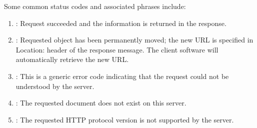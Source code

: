 Some common status codes and associated phrases include:
\begin{enumerate}
    \item {}: Request succeeded and the information is returned in the response.
    \item {}: Requested object has been permanently moved;
    the new URL is specified in Location: header of the response message. The
    client software will automatically retrieve the new URL.
    \item {}: This is a generic error code indicating that the request
could not be understood by the server.
    \item {}: The requested document does not exist on this server.
    \item {}: The requested HTTP protocol
    version is not supported by the server.
\end{enumerate}